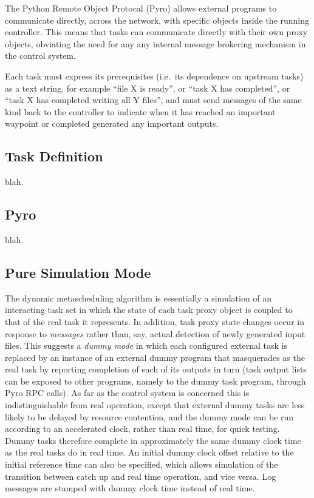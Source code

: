 \documentclass[11pt,a4paper]{article}
\begin{document}
The Python Remote Object Protocal (Pyro) allows external programs to
communicate directly, across the network, with specific objects inside
the running controller. This means that tasks can communicate directly
with their own proxy objects, obviating the need for any any internal
message brokering mechanism in the control system.    

Each task must express its prerequisites (i.e.\ its dependence on
upstream tasks) as a text string, for example ``file X is ready'', or
``task X has completed'', or ``task X has completed writing all Y
files'', and must send messages of the same kind back to the controller
to indicate when it has reached an important waypoint or completed
generated any important outputs.  


\subsection{Task Definition}
blah.

\subsection{Pyro}
blah.

\subsection{Pure Simulation Mode}

The dynamic metascheduling algorithm is essentially a simulation of an
interacting task set in which the state of each task proxy object is
coupled to that of the real task it represents. In addition, task proxy
state changes occur in response to {\em messages} rather than, say,
actual detection of newly generated input files.  This suggests
a {\em dummy mode} in which each configured external task is replaced by
an instance of an external dummy program that masquerades as the real
task by reporting completion of each of its outputs in turn (task output
lists can be exposed to other programs, namely to the dummy task
program, through Pyro RPC calls). As far as the control system is
concerned this is indistinguishable from real operation, except that
external dummy tasks are less likely to be delayed by resource
contention, and the dummy mode can be run according to an accelerated
clock, rather than real time, for quick testing.  Dummy tasks therefore
complete in approximately the same dummy clock time as the real tasks do
in real time. An initial dummy clock offset relative to the initial
reference time can also be specified, which allows simulation of the
transition between catch up and real time operation, and vice versa. Log
messages are stamped with dummy clock time instead of real time.
\end{document}
